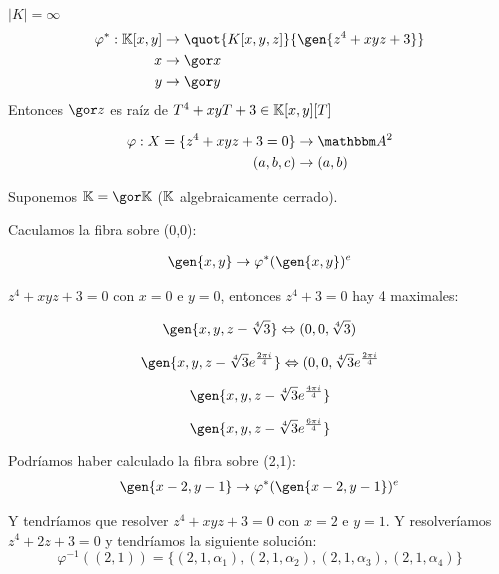 \begin{example}
	
	$|K| = \infty$
	\begin{align*}
		\varphi^*: \K[x,y]& \rightarrow \quot{K[x,y,z]}{\gen{z^4+xyz+3}} \\
		x & \rightarrow \cls{x} \\
		y & \rightarrow \cls{y} \\
	\end{align*}
	Entonces $\cls{z}$ es raíz de $T^4+xyT+3 \in \mathbb{K}[x,y][T]$
	
	\begin{align*}
		\varphi: X=\{ z^4+xyz+3=0  \} & \rightarrow \A^2 \\
		(a,b,c) & \rightarrow (a,b)
	\end{align*}
	
	Suponemos $\K= \cls{\K}$ ($\mathbb{K}$ algebraicamente cerrado).
	
	Caculamos la fibra sobre (0,0):
	
	\begin{align*}
		\gen{x,y} & \rightarrow \varphi^*(\gen{x,y})^e \\
	\end{align*}
	
	$z^4+xyz+3=0$ con $x=0$ e $y=0$, entonces $z^4+3=0$ hay 4 maximales:
	
	$$\gen{x,y,z- \sqrt[4]{3}} \Leftrightarrow (0,0,\sqrt[4]{3})$$
	
	$$\gen{x,y,z- \sqrt[4]{3}e^{\frac{2 \pi i}{4}}} \Leftrightarrow (0,0,\sqrt[4]{3}e^{\frac{2 \pi i}{4}}$$
	
	$$\gen{x,y,z- \sqrt[4]{3}e^{\frac{4 \pi i}{4}}}$$
	
	$$\gen{x,y,z- \sqrt[4]{3}e^{\frac{6 \pi i}{4}}}$$	
			
			
	Podríamos haber calculado la fibra sobre (2,1):
	\begin{align*}
		\gen{x-2,y-1} & \rightarrow \varphi^*(\gen{x-2,y-1})^e \\
	\end{align*}
	
	Y tendríamos que resolver $z^4+xyz+3=0$ con $x=2$ e $y=1$. Y resolveríamos $z^4+2z+3=0$ y tendríamos la siguiente solución:
	$$\varphi^{-1}((2,1))=\{ (2,1,\alpha_1), (2,1,\alpha_2),(2,1,\alpha_3), (2,1,\alpha_4) \}$$
\end{example}

